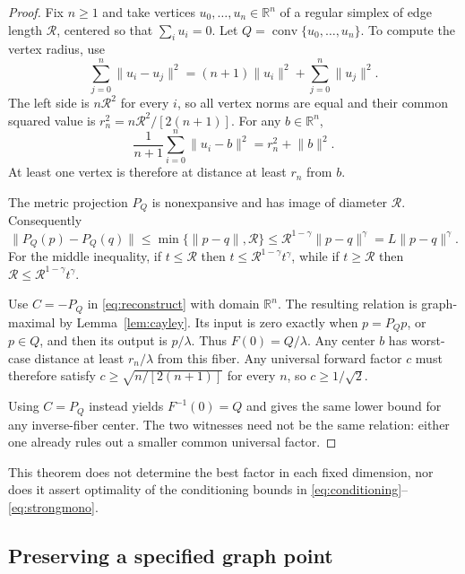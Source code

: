 \documentclass[11pt]{article}
\numberwithin{equation}{section}
\theoremstyle{definition}
\theoremstyle{remark}
\newcommand{\R}{\mathbb R}
\newcommand{\conv}{\operatorname{conv}}
\newcommand{\rad}{\mathcal R}
\newcommand{\norm}[1]{\lVert #1\rVert}
\begin{document}
\begin{proof}
Fix $n\ge1$ and take vertices $u_0,\ldots,u_n\in\R^n$ of a regular
simplex of edge length $\rad$, centered so that $\sum_i u_i=0$.
Let $Q=\conv\{u_0,\ldots,u_n\}$. To compute the vertex radius, use
\[
 \sum_{j=0}^n\norm{u_i-u_j}^2
 =(n+1)\norm{u_i}^2+\sum_{j=0}^n\norm{u_j}^2.
\]
The left side is $n\rad^2$ for every $i$, so all vertex norms are equal
and their common squared value is
$r_n^2=n\rad^2/[2(n+1)]$. For any $b\in\R^n$,
\[
 \frac1{n+1}\sum_{i=0}^n\norm{u_i-b}^2=r_n^2+\norm{b}^2.
\]
At least one vertex is therefore at distance at least $r_n$ from $b$.

The metric projection $P_Q$ is nonexpansive and has image of diameter
$\rad$. Consequently
\[
 \norm{P_Q(p)-P_Q(q)}
 \le\min\{\norm{p-q},\rad\}
 \le\rad^{1-\gamma}\norm{p-q}^\gamma
 =L\norm{p-q}^\gamma.
\]
For the middle inequality, if $t\le\rad$ then
$t\le\rad^{1-\gamma}t^\gamma$, while if $t\ge\rad$ then
$\rad\le\rad^{1-\gamma}t^\gamma$.

Use $C=-P_Q$ in \eqref{eq:reconstruct} with domain $\R^n$. The resulting
relation is graph-maximal by Lemma~\ref{lem:cayley}. Its input is zero
exactly when $p=P_Qp$, or $p\in Q$, and then its output is $p/\lambda$.
Thus $F(0)=Q/\lambda$. Any center $b$ has worst-case distance at least
$r_n/\lambda$ from this fiber. Any universal forward factor $c$ must
therefore satisfy $c\ge\sqrt{n/[2(n+1)]}$ for every $n$, so
$c\ge1/\sqrt2$.

Using $C=P_Q$ instead yields $F^{-1}(0)=Q$ and gives the same lower
bound for any inverse-fiber center. The two witnesses need not be the
same relation: either one already rules out a smaller common universal
factor.
\end{proof}

This theorem does not determine the best factor in each fixed dimension,
nor does it assert optimality of the conditioning bounds in
\eqref{eq:conditioning}--\eqref{eq:strongmono}.

\subsection{Preserving a specified graph point}
\end{document}
